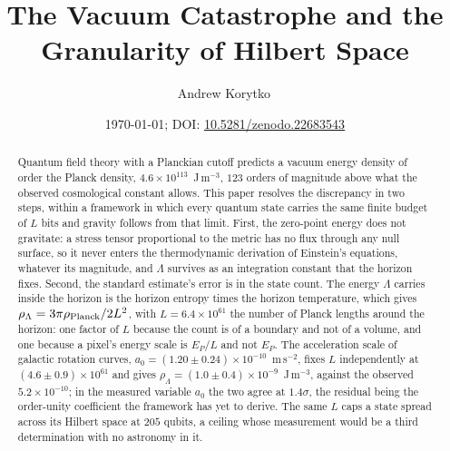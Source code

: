 \documentclass[aps,prd,twocolumn,superscriptaddress,nofootinbib,showkeys]{revtex4-2}
\begin{document}
\title{The Vacuum Catastrophe and the Granularity of Hilbert Space}

\author{Andrew Korytko\,}

\date{\today; DOI: \href{https://doi.org/10.5281/zenodo.22683543}{10.5281/zenodo.22683543}}

\begin{abstract}
Quantum field theory with a Planckian cutoff predicts a vacuum energy density of order the Planck density, $4.6\times10^{113}$~J\,m$^{-3}$, $123$ orders of magnitude above what the observed cosmological constant allows. This paper resolves the discrepancy in two steps, within a framework in which every quantum state carries the same finite budget of $L$ bits and gravity follows from that limit. First, the zero-point energy does not gravitate: a stress tensor proportional to the metric has no flux through any null surface, so it never enters the thermodynamic derivation of Einstein's equations, whatever its magnitude, and $\Lambda$ survives as an integration constant that the horizon fixes. Second, the standard estimate's error is in the state count. The energy $\Lambda$ carries inside the horizon is the horizon entropy times the horizon temperature, which gives $\rho_\Lambda = 3\pi\rho_{\rm Planck}/2L^2$, with $L = 6.4\times10^{61}$ the number of Planck lengths around the horizon: one factor of $L$ because the count is of a boundary and not of a volume, and one because a pixel's energy scale is $E_P/L$ and not $E_P$. The acceleration scale of galactic rotation curves, $a_0 = (1.20\pm0.24)\times10^{-10}$~m\,s$^{-2}$, fixes $L$ independently at $(4.6\pm0.9)\times10^{61}$ and gives $\rho_\Lambda = (1.0\pm0.4)\times10^{-9}$~J\,m$^{-3}$, against the observed $5.2\times10^{-10}$; in the measured variable $a_0$ the two agree at $1.4\sigma$, the residual being the order-unity coefficient the framework has yet to derive. The same $L$ caps a state spread across its Hilbert space at $205$ qubits, a ceiling whose measurement would be a third determination with no astronomy in it.
\end{abstract}


\maketitle
\end{document}
